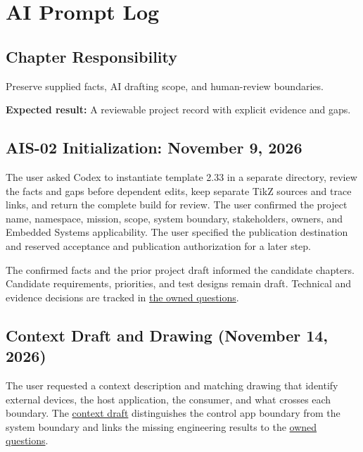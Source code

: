 \chapter{AI Prompt Log}
\section{Chapter Responsibility}
\label{Section:AIPromptLogResponsibility}
Preserve supplied facts, AI drafting scope, and human-review boundaries.

\noindent\textbf{Expected result:} A reviewable project record with explicit evidence and gaps.


\section{AIS-02 Initialization: November 9, 2026}
The user asked Codex to instantiate template 2.33 in a separate directory,
review the facts and gaps before dependent edits, keep separate TikZ sources
and trace links, and return the complete build for review. The user confirmed
the project name, namespace, mission, scope, system boundary, stakeholders,
owners, and Embedded Systems applicability. The user specified the
publication destination and reserved acceptance and publication authorization
for a later step.

The confirmed facts and the prior project draft informed the candidate
chapters. Candidate requirements, priorities, and test designs remain draft.
Technical and evidence decisions are tracked in
\hyperref[Table:OwnedQuestions]{the owned questions}.

\section{Context Draft and Drawing (November 14, 2026)}
The user requested a context description and matching drawing that identify
external devices, the host application, the consumer, and what crosses each
boundary. The \hyperref[Section:MeasurementMission]{context draft} distinguishes
the control app boundary from the system boundary and links the missing
engineering results to the \hyperref[Table:OwnedQuestions]{owned questions}.

